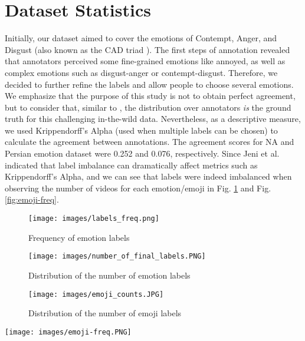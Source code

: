 \documentclass[letterpaper, 10 pt, conference]{ieeeconf}  \usepackage{FG2021}
\begin{document}
 \section{Dataset Statistics}
  Initially, our dataset aimed to cover the emotions of Contempt, Anger, and Disgust (also known as the CAD triad \cite{rozin-cad}). The first steps of annotation revealed that annotators perceived some fine-grained emotions like annoyed, as well as complex emotions such as disgust-anger or contempt-disgust. Therefore, we decided to further refine the labels and allow people to choose several emotions. We emphasize that the purpose of this study is not to obtain perfect agreement, but to consider that, similar to \cite{ml_speech}, the distribution over annotators \emph{is} the ground truth for this challenging in-the-wild data. Nevertheless, as a descriptive measure, we used Krippendorff’s Alpha (used when multiple labels can be chosen) to calculate the agreement between annotations. The agreement scores for NA and Persian emotion dataset were 0.252 and 0.076, respectively. Since Jeni et al. \cite{jeni2013} indicated that label imbalance can dramatically affect metrics such as Krippendorff’s  Alpha, and we can see that labels were indeed imbalanced when observing the number of videos for each emotion/emoji in Fig. \ref{fig:emotion-freq} and Fig. \ref{fig:emoji-freq}.
 
 
 \begin{figure}[t]
 \centering
\texttt{[image: images/labels\_freq.png]}
\caption{Frequency of emotion labels}
\label{fig:emotion-freq}
\end{figure}


 
 \begin{figure}[t]
 \centering
\texttt{[image: images/number\_of\_final\_labels.PNG]}
\caption{Distribution of the number of emotion labels}
\label{fig:labels-dist}
\end{figure}



\begin{figure}[t]
\centering
\texttt{[image: images/emoji\_counts.JPG]}
\caption{Distribution of the number of emoji labels}
\label{fig:emoji-dist}
\end{figure}



\begin{figure*}
\centering
\texttt{[image: images/emoji-freq.PNG]}
\caption{Frequency of emoji labels}
\label{fig:emoji-freq}
\end{figure*}
\end{document}
